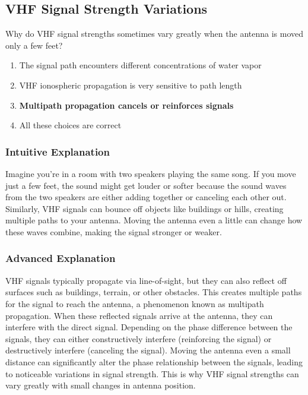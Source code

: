\subsection{VHF Signal Strength Variations}\label{T3A01}

\begin{tcolorbox}[colback=gray!10!white,colframe=black!75!black,title=T3A01]
Why do VHF signal strengths sometimes vary greatly when the antenna is moved only a few feet?
\begin{enumerate}[noitemsep]
    \item The signal path encounters different concentrations of water vapor
    \item VHF ionospheric propagation is very sensitive to path length
    \item \textbf{Multipath propagation cancels or reinforces signals}
    \item All these choices are correct
\end{enumerate}
\end{tcolorbox}

\subsubsection*{Intuitive Explanation}
Imagine you're in a room with two speakers playing the same song. If you move just a few feet, the sound might get louder or softer because the sound waves from the two speakers are either adding together or canceling each other out. Similarly, VHF signals can bounce off objects like buildings or hills, creating multiple paths to your antenna. Moving the antenna even a little can change how these waves combine, making the signal stronger or weaker.

\subsubsection*{Advanced Explanation}
VHF signals typically propagate via line-of-sight, but they can also reflect off surfaces such as buildings, terrain, or other obstacles. This creates multiple paths for the signal to reach the antenna, a phenomenon known as multipath propagation. When these reflected signals arrive at the antenna, they can interfere with the direct signal. Depending on the phase difference between the signals, they can either constructively interfere (reinforcing the signal) or destructively interfere (canceling the signal). Moving the antenna even a small distance can significantly alter the phase relationship between the signals, leading to noticeable variations in signal strength. This is why VHF signal strengths can vary greatly with small changes in antenna position.